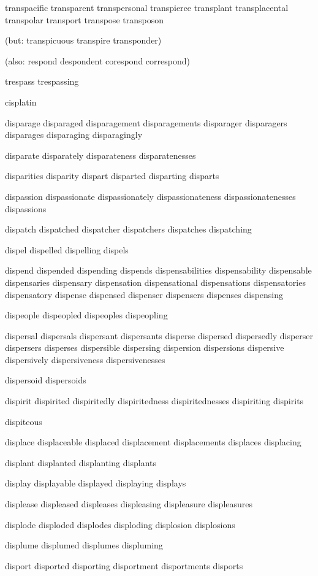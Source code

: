 \begin{itemize}
transpacific transparent transpersonal transpierce  transplant transplacental transpolar transport transpose transposon

(but: transpicuous transpire transponder)

(also: respond despondent corespond correspond)

trespass trespassing

cisplatin

disparage disparaged disparagement disparagements disparager disparagers disparages disparaging disparagingly

disparate disparately disparateness disparatenesses

disparities disparity dispart disparted disparting disparts

dispassion dispassionate dispassionately dispassionateness dispassionatenesses dispassions

dispatch dispatched dispatcher dispatchers dispatches dispatching

dispel dispelled dispelling dispels

dispend dispended dispending dispends dispensabilities dispensability dispensable dispensaries dispensary dispensation dispensational dispensations dispensatories dispensatory dispense dispensed dispenser dispensers dispenses dispensing

dispeople dispeopled dispeoples dispeopling

dispersal dispersals dispersant dispersants disperse dispersed dispersedly disperser dispersers disperses dispersible dispersing dispersion dispersions dispersive dispersively dispersiveness dispersivenesses

dispersoid dispersoids

dispirit dispirited dispiritedly dispiritedness dispiritednesses dispiriting dispirits

dispiteous

displace displaceable displaced displacement displacements displaces displacing

displant displanted displanting displants

display displayable displayed displaying displays

displease displeased displeases displeasing displeasure displeasures

displode disploded displodes disploding displosion displosions

displume displumed displumes displuming

disport disported disporting disportment disportments disports


\end{itemize}
